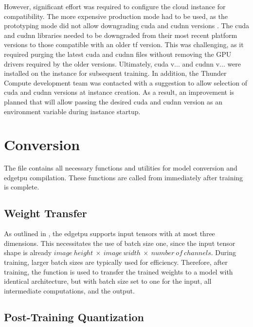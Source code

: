 {However, significant effort was required to configure the cloud instance for compatibility.
The more expensive production mode had to be used, as the prototyping mode did not allow downgrading \gls{cuda} and \gls{cudnn} versions \cite{thundercomputeProtProd}.
The \gls{cuda} and \gls{cudnn} libraries needed to be downgraded from their most recent platform versions to those compatible with an older \gls{tf} version.
This was challenging, as it required purging the latest \gls{cuda} and \gls{cudnn} files without removing the GPU drivers required by the older versions.
Ultimately, \gls{cuda} v... and \gls{cudnn} v... were installed on the instance for subsequent training.
In addition, the Thunder Compute development team was contacted with a suggestion to allow selection of \gls{cuda} and \gls{cudnn} versions at instance creation.
As a result, an improvement is planned that will allow passing the desired \gls{cuda} and \gls{cudnn} version as an environment variable during instance startup.

\section{Conversion}
\label{sec:conversion}

The file  contains all necessary functions and utilities for model conversion and \gls{edgetpu} compilation.
These functions are called from  immediately after training is complete.

\subsection*{Weight Transfer}

As outlined in , the \gls{edgetpu} supports input tensors with at most three dimensions.
This necessitates the use of batch size one, since the input tensor shape is already \ensuremath{image~height~\times~image~width~\times~number~of~channels}.
During training, larger batch sizes are typically used for efficiency.
Therefore, after training, the function  is used to transfer the trained weights to a model with identical architecture,
but with batch size set to one for the input, all intermediate computations, and the output.

\subsection*{Post-Training Quantization}

}

